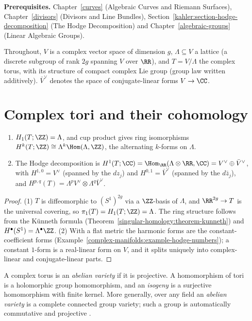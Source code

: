 \noindent\textbf{Prerequisites.} Chapter~\ref{curves} (Algebraic Curves and Riemann Surfaces), Chapter~\ref{divisors} (Divisors and Line Bundles),
Section~\ref{kahler:section-hodge-decomposition} (The Hodge Decomposition) and Chapter~\ref{algebraic-groups} (Linear Algebraic Groups).

Throughout, $V$ is a complex vector space of dimension $g$, $\Lambda \subseteq V$ a lattice (a discrete subgroup of rank $2g$ spanning $V$ over $\RR$), and $T = V/\Lambda$ the complex
torus, with its structure of compact complex Lie group (group law written additively). $\bar V^\vee$ denotes the space of conjugate-linear forms $V \to \CC$.

\section{Complex tori and their cohomology}\label{algebraic-groups:section-tori-abelian-varieties}

\begin{proposition}\label{algebraic-groups:proposition-torus-cohomology}
\begin{enumerate}
\item $H_1(T; \ZZ) = \Lambda$, and cup product gives ring isomorphisms $H^k(T; \ZZ) \cong \Lambda^k\Hom(\Lambda, \ZZ)$, the alternating $k$-forms on $\Lambda$.
\item The Hodge decomposition is $H^1(T; \CC) = \Hom_\RR(\Lambda \otimes \RR, \CC) = V^\vee \oplus \bar V^\vee$, with $H^{1,0} = V^\vee$ (spanned by the $dz_j$) and
$H^{0,1} = \bar V^\vee$ (spanned by the $d\bar z_j$), and $H^{p,q}(T) = \Lambda^pV^\vee \otimes \Lambda^q\bar V^\vee$.
\end{enumerate}
\end{proposition}

\begin{proof}
(1) $T$ is diffeomorphic to $(S^1)^{2g}$ via a $\ZZ$-basis of $\Lambda$, and $\RR^{2g} \to T$ is the universal covering, so $\pi_1(T) = H_1(T; \ZZ) = \Lambda$. The ring structure follows from
the K\"unneth formula (Theorem~\ref{singular-homology:theorem-kunneth}) and $H^\bullet(S^1) = \Lambda^\bullet\ZZ$. (2) With a flat metric the harmonic forms are the constant-coefficient
forms (Example~\ref{complex-manifolds:example-hodge-numbers}); a constant $1$-form is a real-linear form on $V$, and it splits uniquely into complex-linear and conjugate-linear parts.
\end{proof}

\begin{definition}\label{algebraic-groups:definition-abelian-variety}
A complex torus is an \emph{abelian variety} if it is projective. A homomorphism of tori is a holomorphic group homomorphism, and an \emph{isogeny} is a surjective homomorphism
with finite kernel. More generally, over any field an \emph{abelian variety} is a complete connected group variety; such a group is automatically commutative and projective
\cite[Chapter II]{mumford-abelian}.
\end{definition}

